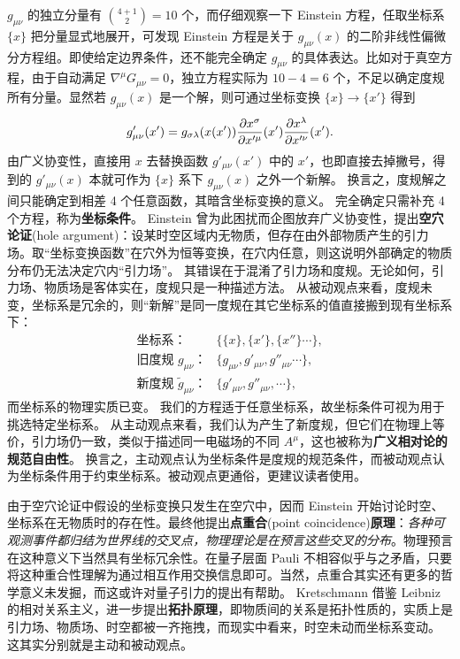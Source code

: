 $g_{\mu\nu}$ 的独立分量有 $\binom{4+1}{2}=10$ 个，而仔细观察一下 Einstein 方程，任取坐标系 $\{x\}$ 把分量显式地展开，可发现 Einstein 方程是关于 $g_{\mu\nu}(x)$ 的二阶非线性偏微分方程组。即使给定边界条件，还不能完全确定 $g_{\mu\nu}$ 的具体表达。比如对于真空方程，由于自动满足 $\nabla^\mu G_{\mu\nu} = 0$，独立方程实际为 $10 - 4 = 6$ 个，不足以确定度规所有分量。显然若 $g_{\mu\nu}(x)$ 是一个解，则可通过坐标变换 $\{x\}\to \{x'\}$ 得到
\[
    g'_{\mu\nu}(x')=g_{\sigma\lambda}(x(x')){\pdv{x^\sigma}{x'^\mu}}(x'){\pdv{x^\lambda}{x'^\nu}}(x').
\]
由广义协变性，直接用 $x$ 去替换函数 $g'_{\mu\nu}(x')$ 中的 $x'$，也即直接去掉撇号，得到的 $g'_{\mu\nu}(x)$ 本就可作为 $\{x\}$ 系下 $g_{\mu\nu}(x)$ 之外一个新解。
换言之，度规解之间只能确定到相差 4 个任意函数，其暗含坐标变换的意义。
完全确定只需补充 4 个方程，称为\textbf{坐标条件}。
Einstein 曾为此困扰而企图放弃广义协变性，提出\textbf{空穴论证}(hole argument)：设某时空区域内无物质，但存在由外部物质产生的引力场。取“坐标变换函数”在穴外为恒等变换，在穴内任意，则这说明外部确定的物质分布仍无法决定穴内“引力场”。
其错误在于混淆了引力场和度规。无论如何，引力场、物质场是客体实在，度规只是一种描述方法。
从被动观点来看，度规未变，坐标系是冗余的，则“新解”是同一度规在其它坐标系的值直接搬到现有坐标系下：
\begin{align*}
    \text{坐标系：}&\{\{x\},\{x'\},\{x''\}\cdots\},\\
    \text{旧度规 $g_{\mu\nu}$：}&\{g_{\mu\nu},g'_{\mu\nu},g''_{\mu\nu}\cdots\},\\
    \text{新度规 $\tilde g_{\mu\nu}$：}&\{g'_{\mu\nu},g''_{\mu\nu},\cdots\},
\end{align*}
而坐标系的物理实质已变。
我们的方程适于任意坐标系，故坐标条件可视为用于挑选特定坐标系。
从主动观点来看，我们认为产生了新度规，但它们在物理上等价，引力场仍一致，类似于描述同一电磁场的不同 $A^\mu$，这也被称为\textbf{广义相对论的规范自由性}。
换言之，主动观点认为坐标条件是度规的规范条件，而被动观点认为坐标条件用于约束坐标系。被动观点更通俗，更建议读者使用。

由于空穴论证中假设的坐标变换只发生在空穴中，因而 Einstein 开始讨论时空、坐标系在无物质时的存在性。最终他提出\textbf{点重合}(point coincidence)\textbf{原理}：\textit{各种可观测事件都归结为世界线的交叉点，物理理论是在预言这些交叉的分布}。物理预言在这种意义下当然具有坐标冗余性。在量子层面 Pauli 不相容似乎与之矛盾，只要将这种重合性理解为通过相互作用交换信息即可。当然，点重合其实还有更多的哲学意义未发掘，而这或许对量子引力的提出有帮助。
Kretschmann 借鉴 Leibniz 的相对关系主义，进一步提出\textbf{拓扑原理}，即物质间的关系是拓扑性质的，实质上是引力场、物质场、时空都被一齐拖拽，而现实中看来，时空未动而坐标系变动。
这其实分别就是主动和被动观点。

